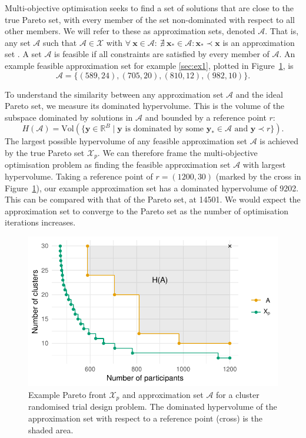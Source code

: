 \documentclass[]{sagej}
\begin{document}
Multi-objective optimisation seeks to find a set of solutions that are close to the true Pareto set, with every member of the set non-dominated with respect to all other members. We will refer to these as approximation sets, denoted $\mathcal{A}$. That is, any set $\mathcal{A}$ such that $\mathcal{A} \in \mathcal{X}$ with $\forall~\mathbf{x} \in \mathcal{A}:~\nexists~\mathbf{x}_{*} \in \mathcal{A} : \mathbf{x}_{*} \prec \mathbf{x}$ is an approximation set \cite{Emmerich2011}. A set $\mathcal{A}$ is feasible if all constraints are satisfied by every member of $\mathcal{A}$. An example feasible approximation set for example \ref{sec:ex1}, plotted in Figure~\ref{fig:fake_pareto}, is 
\begin{equation}
\mathcal{A} = \{ (589, 24), (705, 20), (810, 12), (982, 10) \}.
\end{equation}

To understand the similarity between any approximation set $\mathcal{A}$ and the ideal Pareto set, we measure its dominated hypervolume. This is the volume of the subspace dominated by solutions in $\mathcal{A}$ and bounded by a reference point $r$:
\begin{equation}
H(\mathcal{A}) = \text{Vol}(\{\mathbf{y} \in \mathbb{R}^{B} \mid \mathbf{y} \text{ is dominated by some } \mathbf{y}_{*} \in \mathcal{A} \text{ and } \mathbf{y} \prec r \}). 
\end{equation}
The largest possible hypervolume of any feasible approximation set $\mathcal{A}$ is achieved by the true Pareto set $\mathcal{X}_{p}$. We can therefore frame the multi-objective optimisation problem as finding the feasible approximation set $\mathcal{A}$ with largest hypervolume. Taking a reference point of $r = (1200, 30)$ (marked by the cross in Figure~\ref{fig:fake_pareto}), our example approximation set has a dominated hypervolume of 9202. This can be compared with that of the Pareto set, at 14501. We would expect the approximation set to converge to the Pareto set as the number of optimisation iterations increases.

\begin{figure}
\centering
\includegraphics[scale=0.8]{./Figures/fake_pareto}
\caption{Example Pareto front $\mathcal{X}_{p}$ and approximation set $\mathcal{A}$ for a cluster randomised trial design problem. The dominated hypervolume of the approximation set with respect to a reference point (cross) is the shaded area.}
\label{fig:fake_pareto}
\end{figure}
\end{document}
